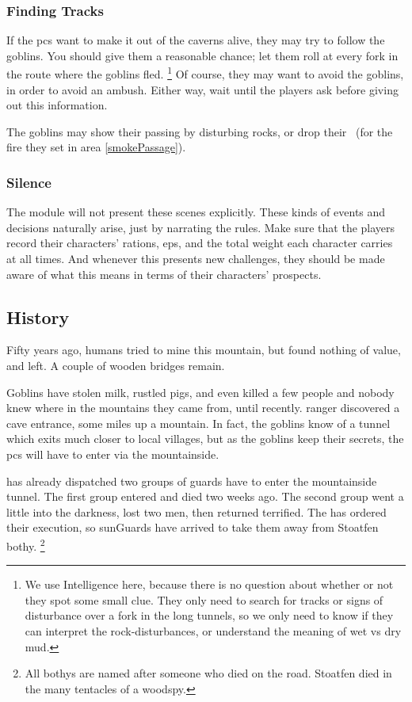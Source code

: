 \begin{multicols}{2}
\subsubsection{Finding Tracks}

If the \glspl{pc} want to make it out of the caverns alive, they may try to follow the goblins.
You should give them a reasonable chance; let them roll  at every fork in the route where the goblins fled.%
\footnote{We use Intelligence here, because there is no question about whether or not they spot some small clue.
They only need to search for tracks or signs of disturbance over a fork in the long tunnels, so we only need to know if they can interpret the rock-disturbances, or understand the meaning of wet vs dry mud.}
Of course, they may want to avoid the goblins, in order to avoid an ambush.
Either way, wait until the players ask before giving out this information.

The goblins may show their passing by disturbing rocks, or drop their \fireFuel\ (for the fire they set in area \ref{smokePassage}).

\subsubsection{Silence}

The module will not present these scenes explicitly.
These kinds of events and decisions naturally arise, just by narrating the rules.
Make sure that the players record their characters' rations, \glspl{ep}, and the total \gls{weight} each character carries at all times.
And whenever this presents new challenges, they should be made aware of what this means in terms of their characters' prospects.

\subsection{History}
\label{caves_history}

\noindent
Fifty years ago, humans tried to mine this mountain, but found nothing of value, and left.
A couple of wooden bridges remain.

Goblins have stolen milk, rustled pigs, and even killed a few people and nobody knew where in the mountains they came from, until recently.
 ranger discovered a cave entrance, some miles up a mountain.
In fact, the goblins know of a tunnel which exits much closer to local \glspl{village}, but as the goblins keep their secrets, the \glspl{pc} will have to enter via the mountainside.

 has already dispatched two groups of \glspl{guard} have to enter the mountainside tunnel.
The first group entered and died two weeks ago.
The second group went a little into the darkness, lost two men, then returned terrified.
The  has ordered their execution, so \glspl{sunGuard} have arrived to take them away from Stoatfen \gls{bothy}.%
\footnote{All \glspl{bothy} are named after someone who died on the road.
Stoatfen died in the many tentacles of a woodspy.}

\end{multicols}

